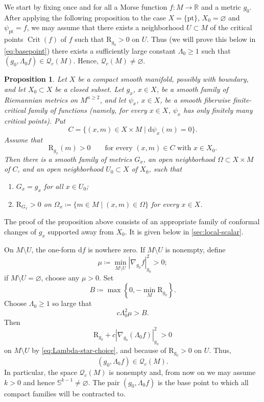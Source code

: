 \documentclass[11pt]{amsart}
\numberwithin{equation}{section}
\newtheorem{proposition}[theorem]{Proposition}
\newcommand{\R}{\mathbb R}
\newcommand{\scal}{\mathrm{R}}
\newcommand{\pt}{{\mathrm{pt}}}
\DeclareMathOperator{\Crit}{Crit}
\newcommand{\Q}{\mathcal Q}
\let\geq\geqslant
\begin{document}
We start by fixing once and for all a Morse function $f\colon M\to\R$ and a metric $g_0$.
After applying the following proposition to the case $X=\{\pt\}$, $X_0=\varnothing$ and $\psi_\pt=f$, we may assume that there exists a neighborhood $U\subset M$ of the critical points $\Crit(f)$ of $f$ such that $\scal_{g_0}>0$ on $U$. Thus (we will prove this below in \eqref{eq:basepoint}) there exists a sufficiently large constant $\Lambda_0\geq 1$ such that $(g_0,\Lambda_0f)\in \mathcal{Q}_c(M)$. Hence, $\mathcal{Q}_c(M)\neq\varnothing$.
\begin{proposition}\label{lem:local-improvement}
Let $X$ be a compact smooth manifold, possibly with boundary, and let
$X_0\subset X$ be a closed subset. Let $g_x$, $x\in X$, be a smooth family of Riemannian metrics on $M^{n\geq 2}$,
and let $\psi_x$, $x\in X$, be a smooth fiberwise finite-critical family of functions (namely, for every $x\in X$, $\psi_x$ has only finitely many critical points). Put
\[
 C=\{(x,m)\in X\times M\mid\mathrm{d}\psi_x(m)=0\}.
\]
Assume that
\begin{equation}\label{eq:positive-on-relative-critical-set}
 \scal_{g_x}(m)>0
 \qquad
 \text{for every }(x,m)\in C\text{ with }x\in X_0.
\end{equation}
Then there is a smooth family of metrics $G_x$, an open neighborhood $\Omega\subset X\times M$ of
$C$, and an open neighborhood $U_0\subset X$ of $X_0$, such that
\begin{enumerate}[label=\textup{(\roman*)}]
\item $G_x=g_x$ for all $x\in U_0$;
\item $\scal_{G_x}>0$ on $\Omega_x\coloneqq \{m\in M\mid(x,m)\in\Omega\}$ for every $x\in X$.
\end{enumerate}
\end{proposition}
\noindent The proof of the proposition above consists of an appropriate family of conformal changes of $g_x$ supported away from $X_0$. 
It is given below in \cref{sec:local-scalar}.

\medskip

On $M\setminus U$, the one-form $\mathrm{d}f$ is nowhere zero. If $M\setminus U$ is nonempty, define
\[
 \mu\coloneqq \min_{M\setminus U}|\nabla_{g_0}f|_{g_0}^2>0;
\]
if $M\setminus U=\varnothing$, choose any $\mu>0$. Set
\[
 B\coloneqq \max\left\{0,-\min_M \scal_{g_0}\right\}.
\]
Choose $\Lambda_0\geq1$ so large that
\begin{equation}\label{eq:Lambda-star-choice}
 c\Lambda_0^2\mu>B.
\end{equation}
Then
\[
 \scal_{g_0}+c|\nabla_{g_0}(\Lambda_0 f)|_{g_0}^2>0
\]
on $M\setminus U$ by \eqref{eq:Lambda-star-choice}, and because of $\scal_{g_0}>0$ on $U$.
Thus,
\begin{equation}\label{eq:basepoint}
 (g_0,\Lambda_0 f)\in\Q_c(M).
\end{equation}
In particular, the space $\Q_c(M)$ is nonempty and, from now on we may assume $k>0$ and hence $\mathbb S^{k-1}\not=\varnothing$.
The pair $(g_0,\Lambda_0 f)$ is the base point to which all compact families will be contracted to.
\smallskip
\end{document}
